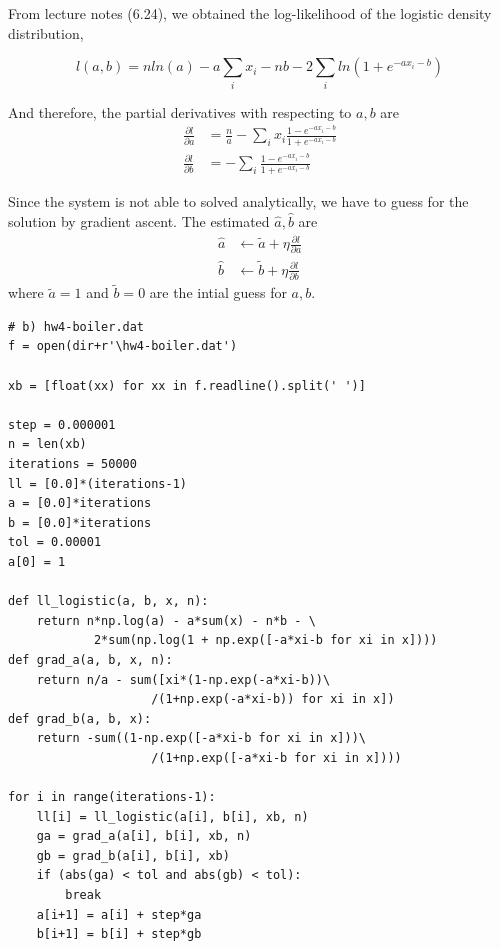 \documentclass[preprint,12pt]{elsarticle}
\begin{document}
\begin{enumerate}[label=\alph*]
        From lecture notes (6.24), we obtained the log-likelihood
        of the logistic density distribution,

        \begin{equation*}
            l(a,b) = nln(a) - a\sum_{i}x_i - nb - 2\sum_{i} ln(1+e^{-ax_i-b})
        \end{equation*}

        And therefore, the partial derivatives with respecting to $a,b$  are
        \begin{align*}
            \frac{\partial l}{\partial a} &= \frac{n}{a} - \sum_{i} x_i\frac{1-e^{-ax_i-b}}{1+e^{-ax_i-b}}\\
            \frac{\partial l}{\partial b} &= -\sum_{i} \frac{1-e^{-ax_i-b}}{1+e^{-ax_i-b}}
        \end{align*}

        Since the system is not able to solved analytically, we have to guess for the 
        solution by gradient ascent. The estimated $\hat{a},\hat{b}$ are 
        \begin{align*}
            \hat{a} &\leftarrow \tilde{a} + \eta \frac{\partial l}{\partial a}\\
            \hat{b} &\leftarrow \tilde{b} + \eta \frac{\partial l}{\partial b}
        \end{align*}
        where $\tilde{a}=1$ and $\tilde{b}=0$ are the intial guess for $a,b$.

        \begin{lstlisting}
# b) hw4-boiler.dat
f = open(dir+r'\hw4-boiler.dat')

xb = [float(xx) for xx in f.readline().split(' ')]

step = 0.000001
n = len(xb)
iterations = 50000
ll = [0.0]*(iterations-1)
a = [0.0]*iterations
b = [0.0]*iterations
tol = 0.00001
a[0] = 1

def ll_logistic(a, b, x, n):
    return n*np.log(a) - a*sum(x) - n*b - \
            2*sum(np.log(1 + np.exp([-a*xi-b for xi in x])))
def grad_a(a, b, x, n):
    return n/a - sum([xi*(1-np.exp(-a*xi-b))\
                    /(1+np.exp(-a*xi-b)) for xi in x])
def grad_b(a, b, x):
    return -sum((1-np.exp([-a*xi-b for xi in x]))\
                    /(1+np.exp([-a*xi-b for xi in x])))

for i in range(iterations-1):
    ll[i] = ll_logistic(a[i], b[i], xb, n)
    ga = grad_a(a[i], b[i], xb, n)
    gb = grad_b(a[i], b[i], xb)
    if (abs(ga) < tol and abs(gb) < tol):
        break
    a[i+1] = a[i] + step*ga
    b[i+1] = b[i] + step*gb
    

\end{lstlisting}
\end{enumerate}
\end{document}

